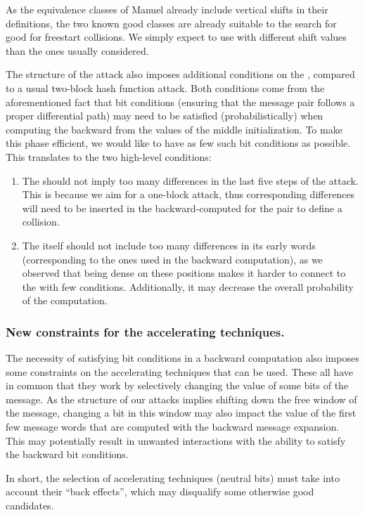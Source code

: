 As the equivalence classes of Manuel already include vertical shifts in their definitions, the two known good classes are already suitable to the search for good \dvs for freestart collisions.
We simply expect to use \dvs with different shift values than the ones usually considered.

\medskip

The structure of the attack also imposes additional conditions on the \dv, compared to a usual two-block hash function attack. Both conditions come from the aforementioned fact that bit conditions
(ensuring that the message pair follows a proper differential path)
may need to be satisfied (probabilistically) when computing the \iv backward from the values of the middle initialization. To make this phase efficient, we would like to have as few such
bit conditions as possible. This translates to the two high-level conditions:
\begin{enumerate}
\item The \dv should not imply too many differences in the last five steps of the attack. This is because we aim for a one-block attack, thus corresponding differences will need to be inserted in the
backward-computed \iv for the pair to define a collision.
\item The \dv itself should not include too many differences in its early words (corresponding to the ones used in the backward computation), as we observed that being dense on these positions makes
it harder to connect to the \iv with few conditions. Additionally, it may decrease the overall probability of the computation.
\end{enumerate}

\subsubsection{New constraints for the accelerating techniques.}
The necessity of satisfying bit conditions in a backward computation also imposes some constraints on the accelerating techniques that can be used. These all have in common that they work by
selectively changing the value of some bits of the message. As the structure of our attacks implies shifting down the free window of the message, changing a bit in this window may also impact
the value of the first few message words that are computed with the backward message expansion. This may potentially result in unwanted interactions with the ability to satisfy the backward bit conditions.

In short, the selection of accelerating techniques (\eg neutral bits) must take into account their ``back effects'', which may disqualify some otherwise good candidates.

